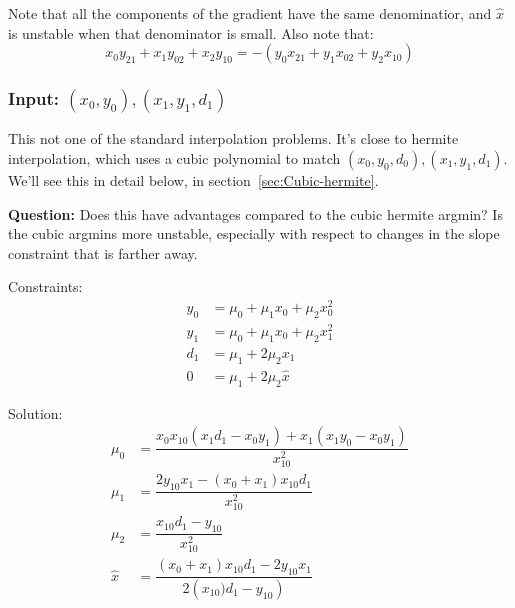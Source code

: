 Note that all the components of the gradient have the same 
denominatior, and
$\hat{x}$ is unstable when that denominator is small.
Also note that:
\begin{equation}
x_0 y_{21} + x_1 y_{02} + x_2 y_{10}
=
- \left(
y_0 x_{21} + y_1 x_{02} + y_2 x_{10}
\right)
\end{equation}



% 

\subsubsection{Input: $(x_0,y_0),(x_1,y_1,d_1)$}\label{sec:monomial-yyd}

This not one of the standard interpolation problems.
It's close to hermite interpolation,
which uses a cubic polynomial to match
$(x_0,y_0,d_0),(x_1,y_1,d_1)$.
We'll see this in detail below,
in section~\ref{sec:Cubic-hermite}.

\textbf{Question:}
Does this have advantages compared to the cubic hermite argmin?
Is the cubic argmins more
unstable, especially with respect to changes in the
slope constraint that is farther away.

% 

Constraints:
\begin{align}
y_0 & = \mu_0+\mu_1 x_0+\mu_2 x_0^{2}  
\\
y_1 & = \mu_0+\mu_1 x_0+\mu_2 x_1^{2}  
\nonumber
\\
d_1 & = \mu_1 + 2 \mu_2 x_1  
\nonumber
\\
0 & = \mu_1 + 2 \mu_2 \hat{x}  
\nonumber
\end{align}

Solution:
\begin{align}
\mu_0 & =
\dfrac{
x_0 x_{10} \left( x_1 d_1 - x_0 y_1 \right) 
+ x_1 \left( x_1 y_0 - x_0 y_1 \right)
}{x_{10}^{2}}
\\
\mu_1 & =
\dfrac{2 y_{10} x_1 - \left(x_0+x_1\right) x_{10} d_1}{x_{10}^{2}}
\nonumber
\\
\mu_2 & = \dfrac{x_{10} d_1 - y_{10}}{x_{10}^{2}}
\nonumber 
\\
\hat{x} & =
\dfrac{
\left(x_0+x_1\right) x_{10} d_1 - 2 y_{10} x_1
}{2 \left(x_{10}) d_1 - y_{10} \right)}
\nonumber 
\end{align}

